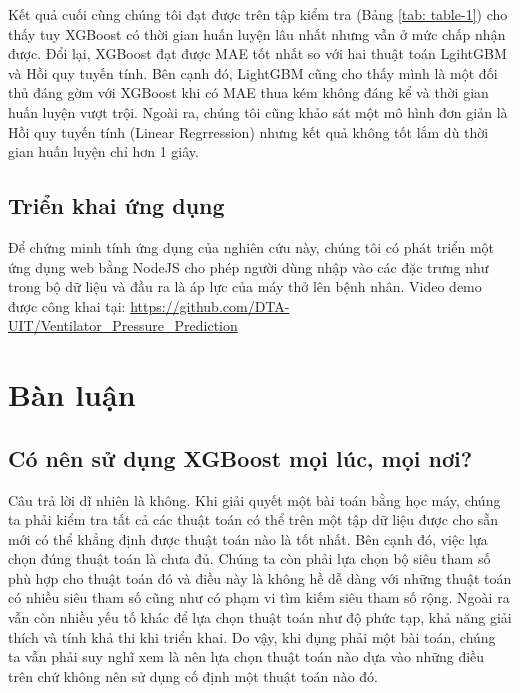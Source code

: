 \documentclass{article}
\begin{document}

Kết quả cuối cùng chúng tôi đạt được trên tập kiểm tra (Bảng \ref{tab: table-1}) cho thấy tuy XGBoost có thời gian huấn luyện lâu nhất nhưng vẫn ở mức chấp nhận được. Đổi lại, XGBoost đạt được MAE tốt nhất so với hai thuật toán LgihtGBM và Hồi quy tuyến tính. Bên cạnh đó, LightGBM cũng cho thấy mình là một đối thủ đáng gờm với XGBoost khi có MAE thua kém không đáng kể và thời gian huấn luyện vượt trội. Ngoài ra, chúng tôi cũng khảo sát một mô hình đơn giản là Hồi quy tuyến tính (Linear Regrression) nhưng kết quả không tốt lắm dù thời gian huấn luyện chỉ hơn 1 giây.

\subsection{Triển khai ứng dụng}
Để chứng minh tính ứng dụng của nghiên cứu này, chúng tôi có phát triển một ứng dụng web bằng NodeJS cho phép người dùng nhập vào các đặc trưng như trong bộ dữ liệu và đầu ra là áp lực của máy thở lên bệnh nhân. Video demo được công khai tại: \url{https://github.com/DTA-UIT/Ventilator_Pressure_Prediction}

\section{Bàn luận}
\subsection{Có nên sử dụng XGBoost mọi lúc, mọi nơi?}
Câu trả lời dĩ nhiên là không. Khi giải quyết một bài toán bằng học máy, chúng ta phải kiểm tra tất cả các thuật toán có thể trên một tập dữ liệu được cho sẵn mới có thể khẳng định được thuật toán nào là tốt nhất. Bên cạnh đó, việc lựa chọn đúng thuật toán là chưa đủ. Chúng ta còn phải lựa chọn bộ siêu tham số phù hợp cho thuật toán đó và điều này là không hề dễ dàng với những thuật toán có nhiều siêu tham số cũng như có phạm vi tìm kiếm siêu tham số rộng. Ngoài ra vẫn còn nhiều yếu tố khác để lựa chọn thuật toán như độ phức tạp, khả năng giải thích và tính khả thi khi triển khai. Do vậy, khi đụng phải một bài toán, chúng ta vẫn phải suy nghĩ xem là nên lựa chọn thuật toán nào dựa vào những điều trên chứ không nên sử dụng cố định một thuật toán nào đó.
\end{document}
